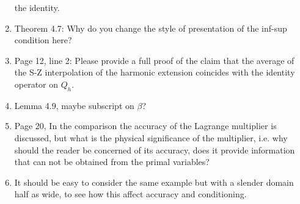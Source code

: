 \documentclass{article}
\begin{document}
\begin{enumerate}
  the identity.
\item Theorem 4.7: Why do you change the style of presentation of the
  inf-sup condition here?
\item Page 12, line 2: Please provide a full proof of the claim that
  the average of the S-Z interpolation of the harmonic extension
  coincides with the identity operator on $Q_h$.
\item Lemma 4.9, maybe subscript on $\beta$?
\item Page 20, In the comparison the accuracy of the Lagrange
  multiplier is discussed, but what is the physical significance of
  the multiplier, i.e. why should the reader be concerned of its
  accuracy, does it provide information that can not be obtained from
  the primal variables?
\item It should be easy to consider the same example but with a
  slender domain half as wide, to see how this affect accuracy and conditioning.
\end{enumerate}
\end{document}
